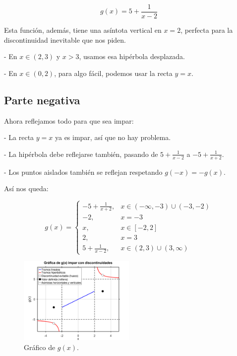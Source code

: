 \documentclass[12pt]{article}
\let\oldincludegraphics\includegraphics
\renewcommand{\includegraphics}[2][]{%
  \oldincludegraphics[width=0.5\textwidth,#1]{#2}%
}
\begin{document}
\[
  g(x) = 5 + \frac{1}{x-2}
\]

Esta función, además, tiene una asíntota vertical en $x=2$, perfecta para la discontinuidad inevitable que nos piden.

- En $x \in (2,3)$ y $x>3$, usamos esa hipérbola desplazada.

- En $x \in (0,2)$, para algo fácil, podemos usar la recta $y=x$.

\subsection*{Parte negativa}
Ahora reflejamos todo para que sea impar:

- La recta $y=x$ ya es impar, así que no hay problema.

- La hipérbola debe reflejarse también, pasando de $5+\frac{1}{x-2}$ a $-5+\frac{1}{x+2}$.

- Los puntos aislados también se reflejan respetando $g(-x) = -g(x)$.


Así nos queda:

\begin{equation}
  g(x) = 
  \begin{cases}
    -5 + \frac{1}{x+2}, & x \in (-\infty, -3) \cup (-3, -2) \\
    -2, & x = -3 \\
    x, & x \in [-2,2] \\
    2, & x = 3 \\
    5 + \frac{1}{x-2}, & x \in (2,3) \cup (3,\infty)
  \end{cases}
\end{equation}

\begin{figure}[H]
  \centering
  \includegraphics{img/g(x).png}
  \caption{Gráfico de $g(x)$.}
\end{figure}
\end{document}
